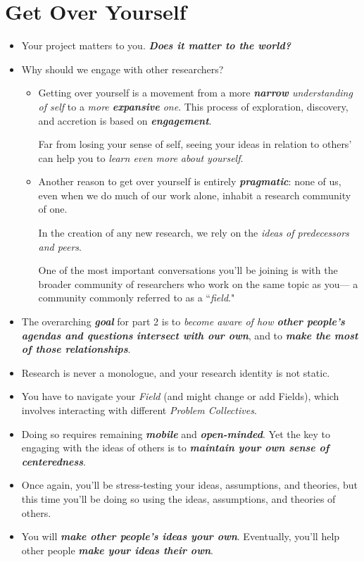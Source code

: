 \documentclass[11pt]{article}
\begin{document}
\section{Get Over Yourself}
\begin{itemize}
\item Your project matters to you. \emph{\textbf{Does it matter to the world?}}

\item Why should we engage with other researchers?
\begin{itemize}
\item Getting over yourself is a movement from a more \emph{\textbf{narrow} understanding of self} to a \emph{more \textbf{expansive} one}.
This process of exploration, discovery, and accretion is based on \emph{\textbf{engagement}}. 

Far from losing your sense of self, seeing your ideas in relation to others’ can help you to \emph{learn even more about yourself}. 

\item Another reason to get over yourself is entirely \emph{\textbf{pragmatic}}:  none of us, even when we do much of our work alone, inhabit a research community of one.

In the creation of any new research, we rely on the \emph{ideas of predecessors and peers}.

One of the most important conversations you’ll be joining is with the broader community of researchers who work on the same topic as you— a community commonly referred to as a ``\emph{field}."

\end{itemize}

\item The overarching \emph{\textbf{goal}} for part 2 is to \emph{become aware of how \textbf{other people’s agendas and questions} \textbf{intersect with our own}}, and to \emph{\textbf{make the most of those relationships}}.

\item Research is never a monologue, and your research identity is not static.

\item You have to navigate your \emph{Field} (and might change or add Fields), which involves interacting with different \emph{Problem Collectives}.

\item Doing so requires remaining \emph{\textbf{mobile}} and \emph{\textbf{open-minded}}. Yet the key to engaging with the ideas of others is to \emph{\textbf{maintain your own sense of centeredness}}.

\item Once again, you’ll be stress-testing your ideas, assumptions, and theories, but this time you’ll be doing so using the ideas, assumptions, and theories of others.

\item You will \emph{\textbf{make other people’s ideas your own}}. Eventually, you’ll help other people \emph{\textbf{make your ideas their own}}.
\end{itemize}
   
\end{document}
